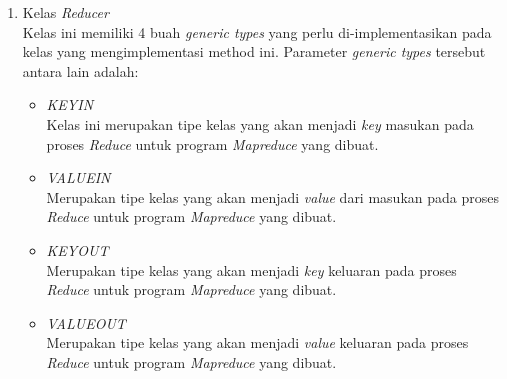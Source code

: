 \begin{enumerate}
	\item{Kelas \textit{Reducer}}\\
	Kelas ini memiliki 4 buah \textit{generic types} yang perlu di-implementasikan pada kelas yang mengimplementasi method ini. Parameter \textit{generic types} tersebut antara lain adalah:
	\begin{itemize}
		\item{\textit{KEYIN}}\\
		Kelas ini merupakan tipe kelas yang akan menjadi \textit{key} masukan pada proses \textit{Reduce} untuk program \textit{Mapreduce} yang dibuat.		
		\item{\textit{VALUEIN}}\\
		Merupakan tipe kelas yang akan menjadi \textit{value} dari masukan pada proses \textit{Reduce} untuk program \textit{Mapreduce} yang dibuat.
		\item{\textit{KEYOUT}}\\
		Merupakan tipe kelas yang akan menjadi \textit{key} keluaran pada proses \textit{Reduce} untuk program \textit{Mapreduce} yang dibuat.
		\item{\textit{VALUEOUT}}\\
		Merupakan tipe kelas yang akan menjadi \textit{value} keluaran pada proses \textit{Reduce} untuk program \textit{Mapreduce} yang dibuat.
	\end{itemize}
\end{enumerate}

